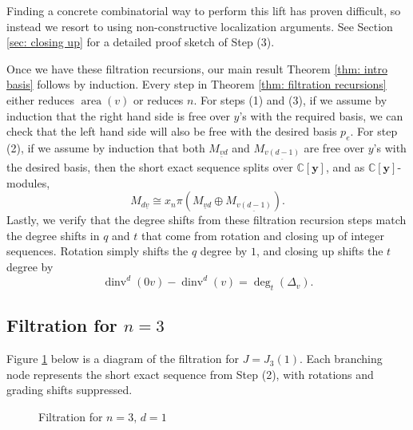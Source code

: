 \documentclass[submission]{FPSAC2027}
\newcommand{\C}{\mathbb{C}}
\DeclareMathOperator{\area}{area}
\DeclareMathOperator{\dinv}{dinv}
\newcommand{\uv}{\underline{v}}
\newcommand{\uz}{\underline{0}}
\newcommand{\Y}{\C[\mathbf{y}]}
\begin{document}
Finding a concrete combinatorial way to perform this lift has proven difficult, so instead we resort to using non-constructive localization arguments. See Section \ref{sec: closing up} for a detailed proof sketch of Step (3).

Once we have these filtration recursions, our main result Theorem \ref{thm: intro basis} follows by induction. Every step in Theorem \ref{thm: filtration recursions} either reduces $\area(v)$ or reduces $n$. For steps (1) and (3), if we assume by induction that the right hand side is free over $y$'s with the required basis, we can check that the left hand side will also be free with the desired basis $p_e$. For step (2), if we assume by induction that both $M_{\uv d}$ and $M_{\underline{v(d-1)}}$ are free over $y$'s with the desired basis, then the short exact sequence splits over $\Y$, and as $\Y$-modules,
\begin{equation}
    M_{d \uv} \cong x_n \pi \left(M_{\uv d} \oplus M_{\underline{v(d-1)}}\right).
\end{equation}
Lastly, we verify that the degree shifts from these filtration recursion steps match the degree shifts in $q$ and $t$ that come from rotation and closing up of integer sequences. Rotation simply shifts the $q$ degree by $1$, and closing up shifts the $t$ degree by 
$$\dinv^d(0v) - \dinv^d(v) = \deg_{t}(\Delta_v).$$

\subsection{Filtration for $n=3$}
\label{sec: n=3}
    Figure \ref{fig: n=3 filtration} below is a diagram of the filtration for $J = J_3(1)$. Each branching node represents the short exact sequence from Step (2), with rotations and grading shifts suppressed.
\begin{figure}[H]
    \centering
{}
\caption{Filtration for $n=3, \, d=1$}
\label{fig: n=3 filtration}
\end{figure}
\end{document}
